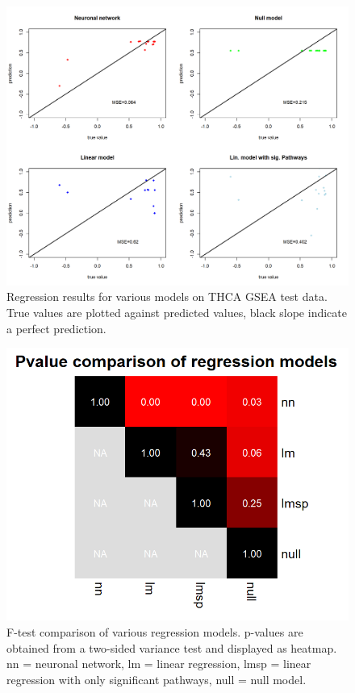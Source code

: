 \documentclass[
]{article}
\begin{document}
\begin{figure}

{\centering \includegraphics[width=0.8\linewidth]{figures/Regression comparison plot IL36 genes} 

}

\caption{Regression results for various models on THCA GSEA test data. True values are plotted against predicted values, black slope indicate a perfect prediction.}\label{fig:reg}
\end{figure}
\begin{figure}

{\centering \includegraphics[width=0.3\linewidth]{figures/Regression comparison Pvalues IL36 genes} 

}

\caption{F-test comparison of various regression models. p-values are obtained from a two-sided variance test and displayed as heatmap. nn = neuronal network, lm = linear regression, lmsp = linear regression with only significant pathways, null = null model.}\label{fig:pval}
\end{figure}
\end{document}
